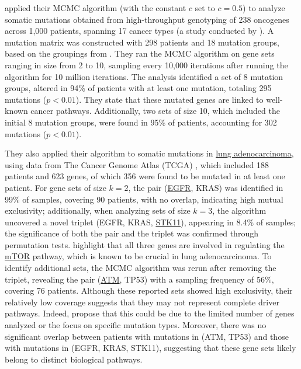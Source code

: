 \textcite{dendrix} applied their MCMC algorithm (with the constant $c$ set to $c = 0.5$) to analyze somatic mutations obtained from high-throughput genotyping of 238 oncogenes across 1,000 patients, spanning 17 cancer types (a study conducted by \textcite{thomas}). A mutation matrix was constructed with 298 patients and 18 mutation groups, based on the groupings from \textcite{thomas}. They ran the MCMC algorithm on gene sets ranging in size from 2 to 10, sampling every 10,000 iterations after running the algorithm for 10 million iterations. The analysis identified a set of 8 mutation groups, altered in 94\% of patients with at least one mutation, totaling 295 mutations ($p < 0.01$). They state that these mutated genes are linked to well-known cancer pathways. Additionally, two sets of size 10, which included the initial 8 mutation groups, were found in 95\% of patients, accounting for 302 mutations ($p < 0.01$).

They also applied their algorithm to somatic mutations in \href{https://en.wikipedia.org/wiki/Adenocarcinoma_of_the_lung}{lung adenocarcinoma}, using data from The Cancer Genome Atlas (TCGA) \cite{tcga}, which included 188 patients and 623 genes, of which 356 were found to be mutated in at least one patient. For gene sets of size $k = 2$, the pair (\href{https://en.wikipedia.org/wiki/Epidermal_growth_factor_receptor}{EGFR}, KRAS) was identified in 99\% of samples, covering 90 patients, with no overlap, indicating high mutual exclusivity; additionally, when analyzing sets of size $k = 3$, the algorithm uncovered a novel triplet (EGFR, KRAS, \href{https://en.wikipedia.org/wiki/STK11}{STK11}), appearing in 8.4\% of samples; the significance of both the pair and the triplet was confirmed through permutation tests. \textcite{dendrix} highlight that all three genes are involved in regulating the \href{https://en.wikipedia.org/wiki/MTOR}{mTOR} pathway, which is known to be crucial in lung adenocarcinoma. To identify additional sets, the MCMC algorithm was rerun after removing the triplet, revealing the pair (\href{https://en.wikipedia.org/wiki/ATM_serine/threonine_kinase}{ATM}, TP53) with a sampling frequency of 56\%, covering 76 patients. Although these reported sets showed high exclusivity, their relatively low coverage suggests that they may not represent complete driver pathways. Indeed, \textcite{dendrix} propose that this could be due to the limited number of genes analyzed or the focus on specific mutation types. Moreover, there was no significant overlap between patients with mutations in (ATM, TP53) and those with mutations in (EGFR, KRAS, STK11), suggesting that these gene sets likely belong to distinct biological pathways.

